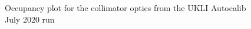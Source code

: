 \begin{figure}
    
\end{figure}

\begin{figure}
    \centering
    
    \caption{Occupancy plot for the collimator optics from the UKLI Autocalib July 2020 run} \label{fig:occupancy_coll_auto} 
    

\end{figure}
